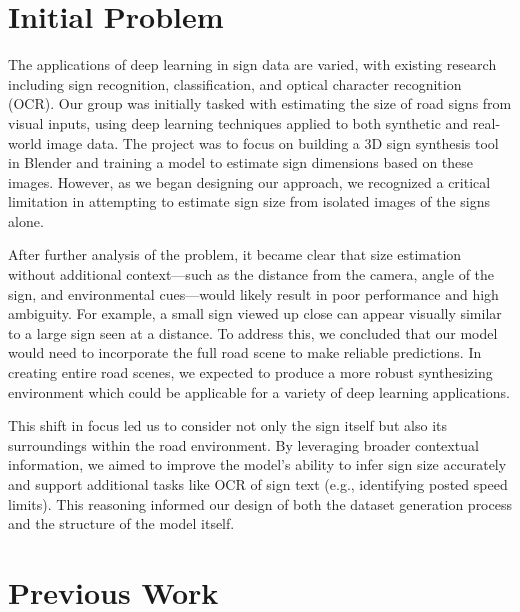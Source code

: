 \documentclass[journal]{IEEEtran}
\begin{document}
\section{Initial Problem}
The applications of deep learning in sign data are varied, with existing research including sign recognition, classification, and optical character recognition (OCR). Our group was initially tasked with estimating the size of road signs from visual inputs, using deep learning techniques applied to both synthetic and real-world image data. The project was to focus on building a 3D sign synthesis tool in Blender and training a model to estimate sign dimensions based on these images. However, as we began designing our approach, we recognized a critical limitation in attempting to estimate sign size from isolated images of the signs alone.

After further analysis of the problem, it became clear that size estimation without additional context—such as the distance from the camera, angle of the sign, and environmental cues—would likely result in poor performance and high ambiguity. For example, a small sign viewed up close can appear visually similar to a large sign seen at a distance. To address this, we concluded that our model would need to incorporate the full road scene to make reliable predictions. In creating entire road scenes, we expected to produce a more robust synthesizing environment which could be applicable for a variety of deep learning applications. 

This shift in focus led us to consider not only the sign itself but also its surroundings within the road environment. By leveraging broader contextual information, we aimed to improve the model’s ability to infer sign size accurately and support additional tasks like OCR of sign text (e.g., identifying posted speed limits). This reasoning informed our design of both the dataset generation process and the structure of the model itself.


\section{Previous Work}
\end{document}
